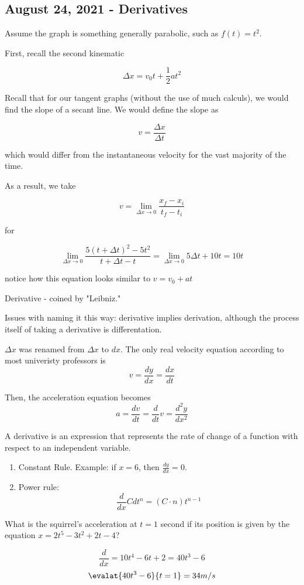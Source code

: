 \documentclass{scrreprt} %
\begin{document}


\subsection{August 24, 2021 - Derivatives}

\begin{example}[Parabolic]

Assume the graph is something generally parabolic, such as $f(t) = t^2$.

First, recall the second kinematic

$$
\Delta x = v_0t + \frac{1}{2}at^2
$$

Recall that for our tangent graphs (without the use of much calculs), we would
find the slope of a secant line. We would define the slope as

$$
v = \frac{\Delta x}{\Delta t}
$$

which would differ from the instantaneous velocity for the vast majority of the
time.

As a result, we take

$$
v = \lim_{\Delta x \rightarrow 0}\frac{x_f - x_i}{t_f - t_i}
$$

for

$$
\lim_{\Delta x \rightarrow 0}\frac{5(t + \Delta t)^2 - 5t^2}{t + \Delta t - t}
= \lim_{\Delta x \rightarrow 0}5\Delta t + 10t = 10t
$$

notice how this equation looks similar to $v = v_0 + at$ 

\end{example}

\begin{remark}
	Derivative - coined by "Leibniz."
	
	Issues with naming it this way: derivative implies derivation, although the
	process itself of taking a derivative is differentation.

	$\Delta x$ was renamed from $\Delta x$ to $dx$. The only real velocity equation
	according to most univeristy professors is $$v = \frac{dy}{dx} = \frac{dx}{dt}$$

	Then, the acceleration equation becomes
	$$a = \frac{dv}{dt} = \frac{d}{dt}v = \frac{d^2y}{dx^2}$$
\end{remark}

\begin{remark}
	A derivative is an expression that represents the rate of change of a function
	with respect to an independent variable.

	\begin{enumerate}
		\item Constant Rule. Example: if $x=6$, then $\frac{dy}{dx}=0$.
		\item Power rule: $$\frac{d}{dx}Cdt^n = (C \cdot n)t^{n-1}$$
	\end{enumerate}
\end{remark}

\begin{example}[Example]
	What is the squirrel's acceleration at $t=1$ second if its position is
	given by the equation $x = 2t^5 - 3t^2 + 2t - 4$?

	$$\frac{d}{dx} = 10t^4 - 6t + 2 = 40t^3 - 6$$
	$$\evalat{40t^3 - 6}{t = 1} = 34 m / s$$
\end{example}
\end{document}
